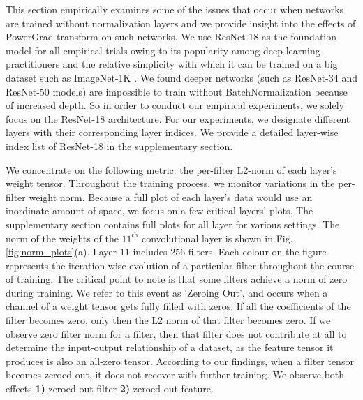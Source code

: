 \documentclass[times,sort&compress]{elsarticle}
\begin{document}
This section empirically examines some of the issues that occur when networks are
trained without normalization layers and we provide insight into the effects of
PowerGrad transform on such networks. We use ResNet-18 \cite{he2016deep} as the
foundation model for all empirical trials owing to its popularity among deep learning
practitioners and the relative simplicity with which it can be trained on a big dataset
such as ImageNet-1K \cite{russakovsky2015imagenet}. We found deeper networks (such as
ResNet-34 and ResNet-50 models) are impossible to train without BatchNormalization
because of increased depth. So in order to conduct our empirical experiments, we solely
focus on the ResNet-18 architecture. For our experiments, we designate different layers
with their corresponding layer indices. We provide a detailed layer-wise index list of
ResNet-18 in the supplementary section.

We concentrate on the following metric: the per-filter L2-norm of each layer's weight
tensor. Throughout the training process, we monitor variations in the per-filter weight
norm. Because a full plot of each layer's data would use an inordinate amount of space,
we focus on a few critical layers' plots. The supplementary section contains full plots
for all layer for various settings. The norm of the weights of the $11^\textit{th}$
convolutional layer is shown in Fig. \ref{fig:norm_plots}(a). Layer $11$ includes $256$
filters. Each colour on the figure represents the iteration-wise evolution of a
particular filter throughout the course of training. The critical point to note is that
some filters achieve a norm of zero during training. We refer to this event as `Zeroing
Out', and occurs when a channel of a weight tensor gets fully filled with zeros. If all
the coefficients of the filter becomes zero, only then the L2 norm of that filter
becomes zero. If we observe zero filter norm for a filter, then that filter does not
contribute at all to determine the input-output relationship of a dataset, as the
feature tensor it produces is also an all-zero tensor. According to our findings, when a
filter tensor becomes zeroed out, it does not recover with further training. We observe
both effects \textbf{1)} zeroed out filter \textbf{2)} zeroed out feature.
\end{document}
